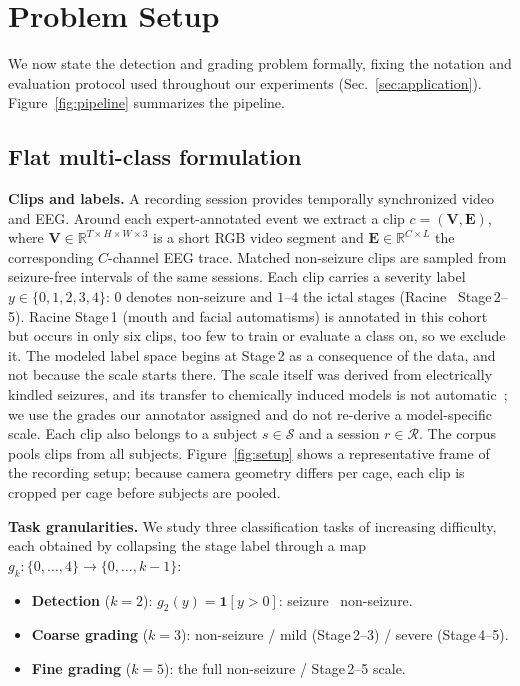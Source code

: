 \section{Problem Setup}
\label{sec:problem}

We now state the detection and grading problem formally, fixing the notation and
evaluation protocol used throughout our experiments (Sec.~\ref{sec:application}).
Figure~\ref{fig:pipeline} summarizes the pipeline.

\subsection{Flat multi-class formulation}
\label{sec:problem:flat}

\noindent\textbf{Clips and labels.}
A recording session provides temporally synchronized video and EEG. Around each
expert-annotated event we extract a clip $c=(\mathbf{V},\mathbf{E})$, where
$\mathbf{V}\in\mathbb{R}^{T\times H\times W\times 3}$ is a short RGB video segment
and $\mathbf{E}\in\mathbb{R}^{C\times L}$ the corresponding $C$-channel EEG trace.
Matched non-seizure clips are sampled from seizure-free intervals of the same
sessions. Each clip carries a severity label $y\in\{0,1,2,3,4\}$: $0$
denotes non-seizure and $1$--$4$ the ictal stages (Racine~\cite{racine1972}
Stage\,2--5). Racine Stage\,1 (mouth and facial automatisms) is annotated in this
cohort but occurs in only six clips, too few to train or evaluate a class on, so we
exclude it. The modeled label space begins at Stage\,2 as a consequence of the
data, and not because the scale starts there. The scale itself was derived from electrically
kindled seizures, and its transfer to chemically induced models is not
automatic~\cite{vanerum2019racine}; we use the grades our annotator assigned and do not re-derive a
model-specific scale. Each clip also belongs to a subject $s\in\mathcal{S}$ and a session
$r\in\mathcal{R}$. The corpus pools clips from all subjects.
Figure~\ref{fig:setup} shows a representative frame of the recording setup;
because camera geometry differs per cage, each clip is cropped per cage before
subjects are pooled.


\noindent\textbf{Task granularities.}
We study three classification tasks of increasing difficulty, each obtained by
collapsing the stage label through a map $g_k:\{0,\dots,4\}\to\{0,\dots,k-1\}$:
\begin{itemize}[leftmargin=1.2em,itemsep=1pt,topsep=2pt]
  \item \textbf{Detection} ($k{=}2$): $g_2(y)=\mathbf{1}[y>0]$: seizure \vs\
        non-seizure.
  \item \textbf{Coarse grading} ($k{=}3$): non-seizure / mild (Stage\,2--3) /
        severe (Stage\,4--5).
  \item \textbf{Fine grading} ($k{=}5$): the full non-seizure / Stage\,2--5 scale.
\end{itemize}

